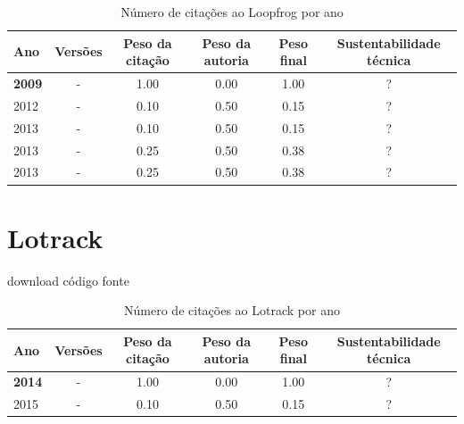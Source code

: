 \begin{table}[H]
\caption{Número de citações ao Loopfrog por ano}
\centering
\begin{tabular}{| l | c | c | c | c | c |}
  \hline
  Ano & Versões & Peso da citação & Peso da autoria & Peso final & Sustentabilidade técnica \\
  \hline
            {\bf 2009}
          &
          -
          &
          1.00
          &
          0.00
          &
            {\color{blue} 1.00}
          &
          ?
          \\
\hline
            2012
          &
          -
          &
          0.10
          &
          0.50
          &
            {\color{red} 0.15}
          &
          ?
          \\
\hline
            2013
          &
          -
          &
          0.10
          &
          0.50
          &
            {\color{red} 0.15}
          &
          ?
          \\
            2013
          &
          -
          &
          0.25
          &
          0.50
          &
            {\color{red} 0.38}
          &
          ?
          \\
            2013
          &
          -
          &
          0.25
          &
          0.50
          &
            {\color{red} 0.38}
          &
          ?
          \\
\hline
\end{tabular}
\end{table}



\section{Lotrack}
\checkmark download
\checkmark código fonte



\begin{table}[H]
\caption{Número de citações ao Lotrack por ano}
\centering
\begin{tabular}{| l | c | c | c | c | c |}
  \hline
  Ano & Versões & Peso da citação & Peso da autoria & Peso final & Sustentabilidade técnica \\
  \hline
            {\bf 2014}
          &
          -
          &
          1.00
          &
          0.00
          &
            {\color{blue} 1.00}
          &
          ?
          \\
\hline
            2015
          &
          -
          &
          0.10
          &
          0.50
          &
            {\color{red} 0.15}
          &
          ?
          \\
\hline
\end{tabular}
\end{table}



